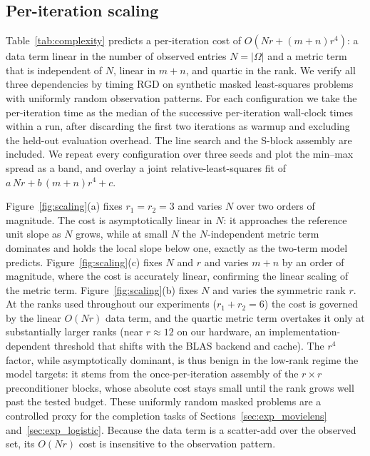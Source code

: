 \documentclass[letterpaper, 10 pt, conference]{ieeeconf}
\theoremstyle{plain}
\theoremstyle{definition}
\theoremstyle{remark}
\begin{document}
\iffalse  %
\begingroup\color{blue}
\subsection{Per-iteration scaling}
\label{sec:exp_scaling}

Table~\ref{tab:complexity} predicts a per-iteration cost of $O(Nr + (m{+}n)r^4)$: a data term linear in the number of observed entries $N=|\Omega|$ and a metric term that is independent of $N$, linear in $m{+}n$, and quartic in the rank. We verify all three dependencies by timing RGD on synthetic masked least-squares problems with uniformly random observation patterns. For each configuration we take the per-iteration time as the median of the successive per-iteration wall-clock times within a run, after discarding the first two iterations as warmup and excluding the held-out evaluation overhead. The line search and the S-block assembly are included. We repeat every configuration over three seeds and plot the min--max spread as a band, and overlay a joint relative-least-squares fit of $a\,Nr + b\,(m{+}n)r^4 + c$.

Figure~\ref{fig:scaling}(a) fixes $r_1{=}r_2{=}3$ and varies $N$ over two orders of magnitude. The cost is asymptotically linear in $N$: it approaches the reference unit slope as $N$ grows, while at small $N$ the $N$-independent metric term dominates and holds the local slope below one, exactly as the two-term model predicts. Figure~\ref{fig:scaling}(c) fixes $N$ and $r$ and varies $m{+}n$ by an order of magnitude, where the cost is accurately linear, confirming the linear scaling of the metric term. Figure~\ref{fig:scaling}(b) fixes $N$ and varies the symmetric rank $r$. At the ranks used throughout our experiments ($r_1{+}r_2{=}6$) the cost is governed by the linear $O(Nr)$ data term, and the quartic metric term overtakes it only at substantially larger ranks (near $r\approx 12$ on our hardware, an implementation-dependent threshold that shifts with the BLAS backend and cache). The $r^4$ factor, while asymptotically dominant, is thus benign in the low-rank regime the model targets: it stems from the once-per-iteration assembly of the $r{\times}r$ preconditioner blocks, whose absolute cost stays small until the rank grows well past the tested budget. These uniformly random masked problems are a controlled proxy for the completion tasks of Sections~\ref{sec:exp_movielens} and~\ref{sec:exp_logistic}. Because the data term is a scatter-add over the observed set, its $O(Nr)$ cost is insensitive to the observation pattern.
\end{document}
